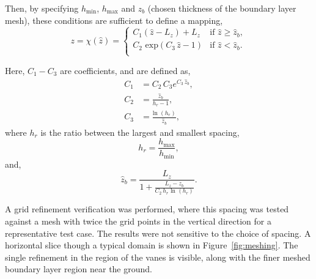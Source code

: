 %
%
Then, by specifying $h_{\text{min}}$, $h_{\text{max}}$ and 
$z_b$ (chosen thickness of the boundary layer mesh), 
these conditions are sufficient to define a mapping, 
\begin{equation}
 z = \chi(\hat z) = 
 \begin{cases} C_1 (\hat z - L_z) + L_z & \text{if } \hat z \geq \hat z_b, \\
   C_2 \text{ exp}(C_3 \, \hat z - 1)      & \text{if } \hat z < \hat z_b. \\
 \end{cases}
\end{equation}

Here, $C_1-C_3$ are coefficients, and are defined as, %
\begin{align}
  C_1 &= C_2 \, C_3 e^{C_3 \, \hat z_b}, \\
  C_2 &= \frac{\hat z_b}{h_r -1}, \\
  C_3 &= \frac{\text{ln }(h_r) }{\hat z_b},
\end{align}
where $h_r$ is the ratio between the largest and smallest spacing, 
\begin{equation}
  h_r = \frac{h_{\text{max}}}{h_{\text{min}}}, 
\end{equation}
and,
\begin{equation}
  \hat z_b = \frac{L_z}{1 + \frac{L_z - z_b}{C_2 \, h_r \text{ ln }(h_r)}}.
\end{equation}


A grid refinement verification was performed, where this spacing was 
tested against a mesh with twice the grid points in the vertical
direction for a representative test case. The results were not sensitive
to the choice of spacing. A horizontal slice though a
typical domain is shown in Figure~\ref{fig:meshing}. The single 
refinement in the region of the vanes is visible, along with the finer 
meshed boundary layer region near the ground. 


